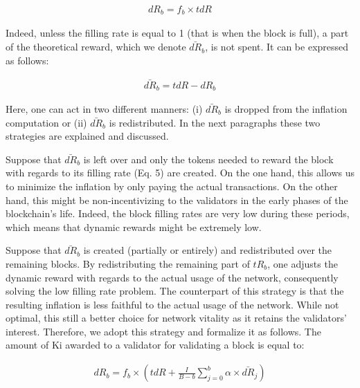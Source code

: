 \documentclass[]{article}
\begin{document}
\begin{ceqn}
	\begin{align}
		dR_b=f_b \times tdR
	\end{align}
\end{ceqn}

Indeed, unless the filling rate is equal to 1 (that is when the block is full), a part of the theoretical reward, which we denote $\bar{dR}_b$, is not spent. It can be expressed as follows:
\begin{ceqn}
	\begin{align}
		\bar{dR}_b=tdR - dR_b
	\end{align}
\end{ceqn}

Here, one can act in two different manners: (i) $\bar{dR}_b$ is dropped from the inflation computation or (ii) $\bar{dR}_b$ is redistributed. In the next paragraphs these two strategies are explained and discussed.

Suppose that $\bar{dR}_b$ is left over and only the tokens needed to reward the block with regards to its filling rate (Eq. 5) are created. On the one hand, this allows us to minimize the inflation by only paying the actual transactions. On the other hand, this might be non-incentivizing to the validators in the early phases of the blockchain's life. Indeed, the block filling rates are very low during these periods, which means that dynamic rewards might be extremely low.

Suppose that $\bar{dR}_b$ is created (partially or entirely) and redistributed over the remaining blocks. By redistributing the remaining part of $tR_b$, one adjusts the dynamic reward with regards to the actual usage of the network, consequently solving the low filling rate problem. The counterpart of this strategy is that the resulting inflation is less faithful to the actual usage of the network. While not optimal, this still a better choice for network vitality as it retains the validators' interest. Therefore, we adopt this strategy and formalize it as follows. The amount of Ki awarded to a validator for validating a block is equal to:

\begin{ceqn}
	\begin{align}
		dR_b=f_b  \times ( tdR + \frac{I}{B-b} \sum_{j=0}^{b} \alpha \times \bar{dR}_j)
	\end{align}
\end{ceqn}
\end{document}
